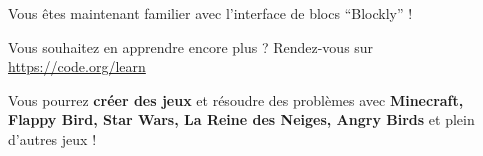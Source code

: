 \documentclass[11pt]{article}
\begin{document}
\bigskip

Vous êtes maintenant familier avec l'interface de blocs \enquote{Blockly} !

\bigskip

Vous souhaitez en apprendre encore plus ? Rendez-vous sur \url{https://code.org/learn}

\bigskip

Vous pourrez \textbf{créer des jeux} et résoudre des problèmes avec \textbf{Minecraft, Flappy Bird, Star Wars, La Reine des Neiges, Angry Birds}
et plein d'autres jeux !
\end{document}
